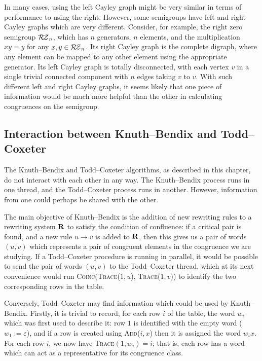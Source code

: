 In many cases, using the left Cayley graph might be very similar in terms of
performance to using the right.  However, some semigroups have left and right
Cayley graphs which are very different.  Consider, for example, the right zero
semigroup $\mathcal{R\!Z}_n$, which has $n$ generators, $n$ elements, and the
multiplication $xy=y$ for any $x,y \in \mathcal{R\!Z}_n$.  Its right Cayley graph is the
complete digraph, where any element can be mapped to any other element using the
appropriate generator.  Its left Cayley graph is totally disconnected, with each
vertex $v$ in a single trivial connected component with $n$ edges taking $v$ to
$v$.  With such different left and right Cayley graphs, it seems likely that one
piece of information would be much more helpful than the other in calculating
congruences on the semigroup.

\subsection{Interaction between Knuth--Bendix and Todd--Coxeter}
\label{sec:linking-kb-tc}
The Knuth--Bendix and Todd--Coxeter algorithms, as described in this chapter, do
not interact with each other in any way.  The Knuth--Bendix process runs in one
thread, and the Todd--Coxeter process runs in another.  However, information from
one could perhaps be shared with the other.

The main objective of Knuth--Bendix is the addition of new rewriting rules to a
rewriting system $\mathbf{R}$ to satisfy the condition of confluence: if a critical
pair is found, and a new rule $u \to v$ is added to $\mathbf{R}$, then this gives us a
pair of words $(u,v)$ which represents a pair of congruent elements in the congruence we
are studying.  If a Todd--Coxeter procedure is running in parallel, it would be
possible to send the pair of words $(u,v)$ to the Todd--Coxeter thread, which
at its next convenience would run \textsc{Coinc(Trace($1, u$), Trace($1, v$))}
to identify the two corresponding rows in the table.

Conversely, Todd--Coxeter may find information which could be used by
Knuth--Bendix.  Firstly, it is trivial to record, for each row $i$ of the table,
the word $w_i$ which was first used to describe it: row $1$ is identified with
the empty word ($w_1 := \varepsilon$), and if a row is created using
\textsc{Add($i, x$)} then it is assigned the word $w_ix$.  For each row $i$, we
now have \textsc{Trace}$(1, w_i) = i$; that is, each row has a word which can
act as a representative for its congruence class.

